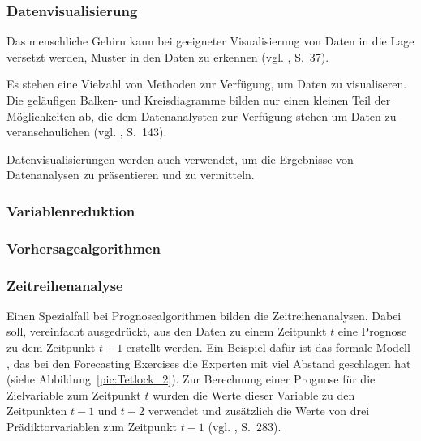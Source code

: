 \subsubsection{Datenvisualisierung}

Das menschliche Gehirn kann bei geeigneter Visualisierung von Daten in die Lage
versetzt werden, Muster in den Daten zu erkennen (vgl. \cite{Runkler}, S.~37).

Es stehen eine Vielzahl von Methoden zur Verfügung, um Daten zu visualiseren.
Die geläufigen Balken- und Kreisdiagramme bilden nur einen kleinen Teil der
Möglichkeiten ab, die dem Datenanalysten zur Verfügung stehen um Daten zu
veranschaulichen (vgl. \cite{Dinov}, S.~143). 

Datenvisualisierungen werden auch verwendet, um die Ergebnisse von Datenanalysen
zu präsentieren und zu vermitteln. 

\subsubsection{Variablenreduktion}

\subsubsection{Vorhersagealgorithmen}



\subsubsection{Zeitreihenanalyse}

Einen Spezialfall bei Prognosealgorithmen bilden die Zeitreihenanalysen. Dabei
soll, vereinfacht ausgedrückt, aus den Daten zu einem Zeitpunkt $t$ eine Prognose zu dem Zeitpunkt $t+1$
erstellt werden. Ein Beispiel dafür ist das formale Modell , das bei den Forecasting
Exercises die Experten mit viel Abstand geschlagen hat (siehe Abbildung~\ref{pic:Tetlock_2}).  
Zur Berechnung einer Prognose für die Zielvariable zum Zeitpunkt $t$ wurden die Werte dieser Variable
zu den Zeitpunkten $t-1$ und $t-2$ verwendet und zusätzlich die Werte von drei Prädiktorvariablen zum Zeitpunkt $t-1$   
(vgl. \cite{Tetlock}, S.~283).



